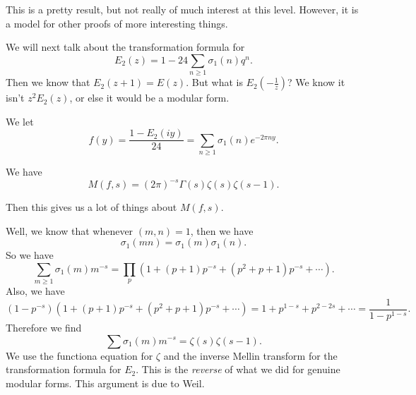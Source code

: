 \documentclass[a4paper]{article}
\begin{document}
This is a pretty result, but not really of much interest at this level. However, it is a model for other proofs of more interesting things.

We will next talk about the transformation formula for
\[
  E_2(z) = 1 - 24 \sum_{n \geq 1} \sigma_1(n) q^n.
\]
Then we know that $E_2(z + 1) = E(z)$. But what is $E_2(-\frac{1}{z})$? We know it isn't $z^2 E_2(z)$, or else it would be a modular form.

We let
\[
  f(y) = \frac{1 - E_2(iy)}{24} = \sum_{n \geq 1} \sigma_1(n) e^{-2\pi n y}.
\]
\begin{claim}
  We have
  \[
    M(f, s) = (2\pi)^{-s} \Gamma(s) \zeta(s) \zeta(s - 1).
  \]
\end{claim}
Then this gives us a lot of things about $M(f, s)$.

Well, we know that whenever $(m, n) = 1$, then we have
\[
  \sigma_1(mn) = \sigma_1(m) \sigma_1(n).
\]
So we have
\[
  \sum_{m \geq 1} \sigma_1(m) m^{-s} = \prod_p (1 + (p + 1) p^{-s} + (p^2 + p + 1) p^{-s} + \cdots).
\]
Also, we have
\[
  (1 - p^{-s}) (1 + (p + 1) p^{-s} + (p^2 + p + 1) p^{-s} + \cdots) = 1 + p^{1 - s} + p^{2 - 2s} + \cdots = \frac{1}{1 - p^{1 - s}}.
\]
Therefore we find
\[
  \sum \sigma_1(m) m^{-s} = \zeta(s) \zeta(s - 1).
\]
We use the functiona equation for $\zeta$ and the inverse Mellin transform for the transformation formula for $E_2$. This is the \emph{reverse} of what we did for genuine modular forms. This argument is due to Weil.
\end{document}
